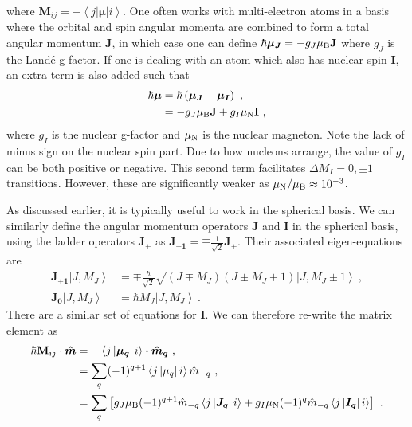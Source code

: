 \documentclass{article}
\begin{document}
where $\mathbf{M}_{ij} = -\left\langle j \left| \boldsymbol{\mu} \right| i \right\rangle$. One often works with multi-electron atoms in a basis where the orbital and spin angular momenta are combined to form a total angular momentum $\mathbf{J}$, in which case one can define $\hbar\boldsymbol{\mu_J} = -g_J\mu_{\rm{B}}\mathbf{J}$ where $g_J$ is the Land\'{e} g-factor. If one is dealing with an atom which also has nuclear spin $\mathbf{I}$, an extra term is also added such that
\begin{align}
    \hbar\boldsymbol{\mu} &= \hbar\left(\boldsymbol{\mu_J} + \boldsymbol{\mu_I}\right)~, \\
    &= -g_J\mu_{\rm{B}}\mathbf{J} + g_I\mu_{\rm{N}}\mathbf{I}~, 
\end{align}
where $g_I$ is the nuclear g-factor and $\mu_{\rm{N}}$ is the nuclear magneton. Note the lack of minus sign on the nuclear spin part. Due to how nucleons arrange, the value of $g_I$ can be both positive or negative. This second term facilitates $\Delta M_I = 0, \pm 1$ transitions. However, these are significantly weaker as $\mu_{\rm{N}}/\mu_{\rm{B}} \approx 10^{-3}$.   

As discussed earlier, it is typically useful to work in the spherical basis. We can similarly define the angular momentum operators $\mathbf{J}$ and $\mathbf{I}$ in the spherical basis, using the ladder operators $\boldsymbol{J_{\pm}}$ as $\boldsymbol{J_{\pm1}} = \mp \frac{1}{\sqrt{2}} \boldsymbol{J_{\pm}}$. Their associated eigen-equations are
\begin{align} \label{eq:eigen}
    \boldsymbol{J_{\pm1}}\left|J, M_J\right\rangle &=  \mp \frac{\hbar}{\sqrt{2}} \sqrt{\left(J\mp M_J\right)\left(J \pm M_J +1\right)}\left|J, M_J \pm 1\right\rangle~, \\
    \boldsymbol{J_{0}}\left|J, M_J\right\rangle &= \hbar M_J\left|J, M_J\right\rangle~.
\end{align}
There are a similar set of equations for $\mathbf{I}$. We can therefore re-write the matrix element as 
\begin{align}
    \hbar\mathbf{M}_{ij} \cdot \boldsymbol{\hat{m}} &= -\left\langle j \left| \boldsymbol{\mu_q} \right| i \right\rangle\boldsymbol \cdot \boldsymbol{\hat{m}_q}~, \\
    &= \sum_q (-1)^{q+1}\left\langle j \left|\mu_q \right| i \right\rangle\hat{m}_{-q}~, \\
    &= \sum_q \left[ g_J \mu_{\rm{B}}(-1)^{q+1}\hat{m}_{-q}\left\langle j \left|\boldsymbol{J_q}\right| i \right\rangle + g_I \mu_{\rm{N}}(-1)^{q}\hat{m}_{-q}\left\langle j \left|\boldsymbol{I_q}\right| i \right\rangle\right] ~.
\end{align}
     
\end{document}
